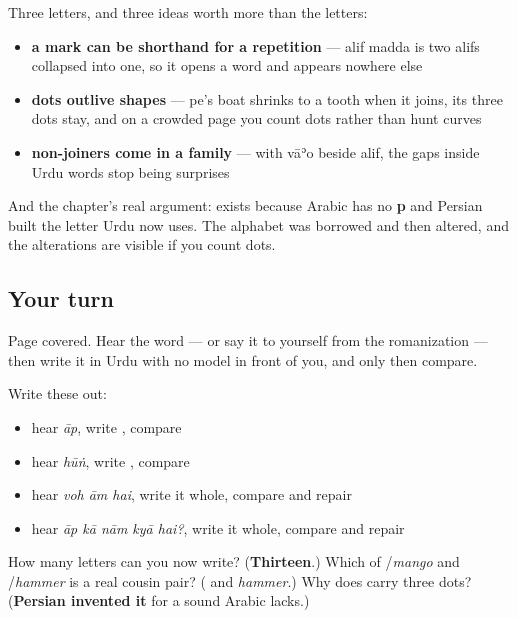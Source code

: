 \begin{grammarlens}[title={What you've built this chapter}]
Three letters, and three ideas worth more than the letters:

\begin{itemize}
\raggedright
  \item \textbf{a mark can be shorthand for a repetition} — alif madda is two alifs collapsed into one, so it opens a word and appears nowhere else
  \item \textbf{dots outlive shapes} — pe's boat shrinks to a tooth when it joins, its three dots stay, and on a crowded page you count dots rather than hunt curves
  \item \textbf{non-joiners come in a family} — with vāʾo beside alif, the gaps inside Urdu words stop being surprises
\end{itemize}

And the chapter's real argument: \textbf{} exists because Arabic has no \textbf{p} and Persian built the letter Urdu now uses. The alphabet was borrowed and then altered, and the alterations are visible if you count dots.
\end{grammarlens}

\subsection*{Your turn}
Page covered. Hear the word — or say it to yourself from the romanization — then write it in Urdu with no model in front of you, and only then compare.

Write these out:

\begin{itemize}
\raggedright
  \item hear \emph{āp}, write \textbf{}, compare
  \item hear \emph{hūṅ}, write \textbf{}, compare
  \item hear \emph{voh ām hai}, write it whole, compare and repair
  \item hear \emph{āp kā nām kyā hai?}, write it whole, compare and repair
\end{itemize}

\begin{tcolorbox}[breakable,colback=teal!4,colframe=teal!35!black,title={Before you move on}]
How many letters can you now write? (\textbf{Thirteen}.) Which of \textbf{}/\emph{mango} and \textbf{}/\emph{hammer} is a real cousin pair? (\textbf{} and \emph{hammer}.) Why does \textbf{} carry three dots? (\textbf{Persian invented it} for a sound Arabic lacks.)
\end{tcolorbox}
